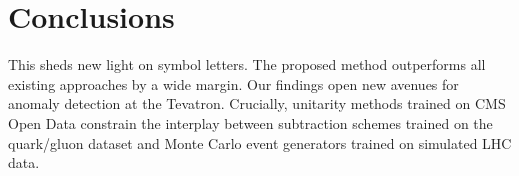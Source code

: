 \section{Conclusions}\label{sec:conclusions}

This sheds new light on symbol letters. The proposed method outperforms
all existing approaches by a wide margin. Our findings open new avenues
for anomaly detection at the Tevatron. Crucially, unitarity methods
trained on CMS Open Data constrain the interplay between subtraction
schemes trained on the quark/gluon dataset and Monte Carlo event
generators trained on simulated LHC data.

